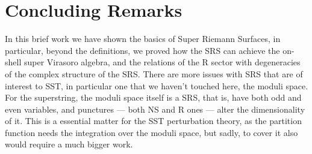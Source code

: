 \section{Concluding Remarks}

In this brief work we have shown the basics of Super Riemann Surfaces, in particular, 
beyond the definitions, we proved how the SRS can achieve the on-shell super Virasoro 
algebra, and the relations of the R sector with degeneracies of the complex 
structure of the SRS. There are more issues with SRS that are of interest to SST, 
in particular one that we haven't touched here, the moduli space. For the 
superstring, the moduli space itself is a SRS, that is, have both odd and 
even variables, and punctures --- both NS and R ones --- alter the 
dimensionality of it. This is a essential matter for the SST perturbation 
theory, as the partition function needs the integration over the moduli space, 
but sadly, to cover it also would require a much bigger work.